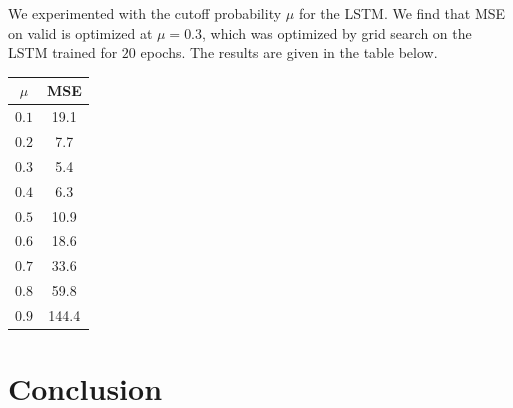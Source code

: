 \documentclass[11pt]{article}
\begin{document}
We experimented with the cutoff probability $\mu$ for the LSTM. We find that MSE on valid is optimized at $\mu = 0.3$, which was optimized by grid search on the LSTM trained for $20$ epochs. The results are given in the table below.  %

\begin{center}
\begin{tabular}{ c c}
  \hline $\mu$ & MSE \\
  \hline $0.1$ & 19.1\\
  $0.2$ & 7.7\\
  $0.3$ & 5.4\\
  $0.4$ & 6.3\\
  $0.5$ & 10.9\\
  $0.6$ & 18.6\\
  $0.7$ & 33.6\\
  $0.8$ & 59.8\\
  $0.9$ & 144.4\\
  \hline
\end{tabular}
\end{center}

\section{Conclusion}





\end{document}
